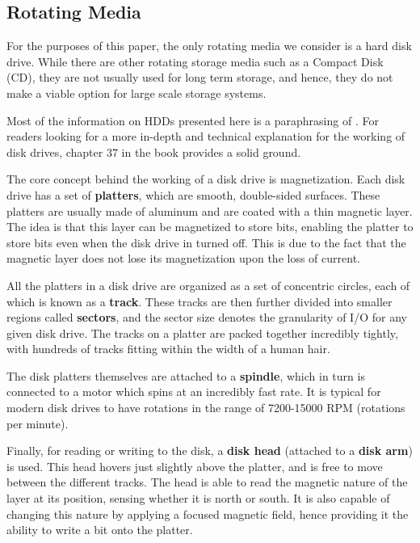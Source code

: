 \documentclass[10pt, author, twocolumn]{article}
\begin{document}
\subsection{Rotating Media}

For the purposes of this paper, the only rotating media we consider is a hard disk drive. While there are other rotating storage media such as a Compact Disk (CD), they are not usually used for long term storage, and hence, they do not make a viable option for large scale storage systems.

Most of the information on HDDs presented here is a paraphrasing of \cite{osbook}. For readers looking for a more in-depth and technical explanation for the working of disk drives, chapter 37 in the book provides a solid ground. 

The core concept behind the working of a disk drive is magnetization. Each disk drive has a set of \textbf{platters}, which are smooth, double-sided surfaces. These platters are usually made of aluminum and are coated with a thin magnetic layer. The idea is that this layer can be magnetized to store bits, enabling the platter to store bits even when the disk drive in turned off. This is due to the fact that the magnetic layer does not lose its magnetization upon the loss of current. 

All the platters in a disk drive are organized as a set of concentric circles, each of which is known as a \textbf{track}. These tracks are then further divided into smaller regions called \textbf{sectors}, and the sector size denotes the granularity of I/O for any given disk drive. The tracks on a platter are packed together incredibly tightly, with hundreds of tracks fitting within the width of a human hair.

The disk platters themselves are attached to a \textbf{spindle}, which in turn is connected to a motor which spins at an incredibly fast rate. It is typical for modern disk drives to have rotations in the range of 7200-15000 RPM (rotations per minute). 

Finally, for reading or writing to the disk, a \textbf{disk head} (attached to a \textbf{disk arm}) is used. This head hovers just slightly above the platter, and is free to move between the different tracks. The head is able to read the magnetic nature of the layer at its position, sensing whether it is north or south. It is also capable of changing this nature by applying a focused magnetic field, hence providing it the ability to write a bit onto the platter.
\end{document}
